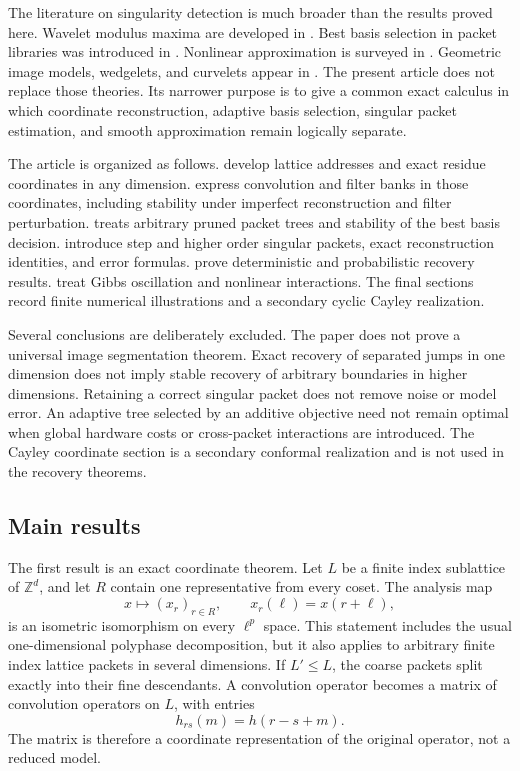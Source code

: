 \documentclass[11pt,letterpaper]{article}
\theoremstyle{plain}
\theoremstyle{plain}
\theoremstyle{plain}
\theoremstyle{definition}
\theoremstyle{definition}
\theoremstyle{definition}
\theoremstyle{definition}
\theoremstyle{remark}
\theoremstyle{remark}
\theoremstyle{remark}
\theoremstyle{remark}
\newcommand{\ZZ}{\mathbb Z}
\begin{document}
The literature on singularity detection is much broader than the results proved here. Wavelet modulus maxima are developed in \cite{MallatHwang1992}. Best basis selection in packet libraries was introduced in \cite{CoifmanWickerhauser1992}. Nonlinear approximation is surveyed in \cite{DeVore1998}. Geometric image models, wedgelets, and curvelets appear in \cite{Donoho1999,CandesDonoho2004}. The present article does not replace those theories. Its narrower purpose is to give a common exact calculus in which coordinate reconstruction, adaptive basis selection, singular packet estimation, and smooth approximation remain logically separate.

The article is organized as follows.  develop lattice addresses and exact residue coordinates in any dimension.  express convolution and filter banks in those coordinates, including stability under imperfect reconstruction and filter perturbation.  treats arbitrary pruned packet trees and stability of the best basis decision.  introduce step and higher order singular packets, exact reconstruction identities, and error formulas.  prove deterministic and probabilistic recovery results.  treat Gibbs oscillation and nonlinear interactions. The final sections record finite numerical illustrations and a secondary cyclic Cayley realization.

Several conclusions are deliberately excluded. The paper does not prove a universal image segmentation theorem. Exact recovery of separated jumps in one dimension does not imply stable recovery of arbitrary boundaries in higher dimensions. Retaining a correct singular packet does not remove noise or model error. An adaptive tree selected by an additive objective need not remain optimal when global hardware costs or cross-packet interactions are introduced. The Cayley coordinate section is a secondary conformal realization and is not used in the recovery theorems.

\subsection{Main results}

The first result is an exact coordinate theorem. Let \(L\) be a finite index sublattice of \(\ZZ^d\), and let \(R\) contain one representative from every coset. The analysis map
\[
x\longmapsto (x_r)_{r\in R},
\qquad
x_r(\ell)=x(r+\ell),
\]
is an isometric isomorphism on every \(\ell^p\) space. This statement includes the usual one-dimensional polyphase decomposition, but it also applies to arbitrary finite index lattice packets in several dimensions. If \(L'\leq L\), the coarse packets split exactly into their fine descendants. A convolution operator becomes a matrix of convolution operators on \(L\), with entries
\[
h_{rs}(m)=h(r-s+m).
\]
The matrix is therefore a coordinate representation of the original operator, not a reduced model.
\end{document}
